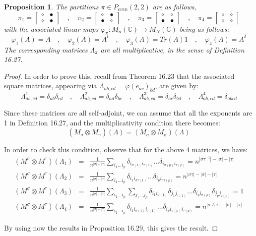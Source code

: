 \documentclass[12pt]{amsbook}
\newtheorem{proposition}[theorem]{Proposition}
\begin{document}
\begin{proposition}
The partitions $\pi\in P_{even}(2,2)$ are as follows,
$$\pi_1=\begin{bmatrix}\circ&\bullet\\ \circ&\bullet\end{bmatrix}\quad,\quad
\pi_2=\begin{bmatrix}\circ&\bullet\\ \bullet&\circ\end{bmatrix}\quad,\quad
\pi_3=\begin{bmatrix}\circ&\circ\\ \bullet&\bullet\end{bmatrix}\quad,\quad
\pi_4=\begin{bmatrix}\circ&\circ\\ \circ&\circ\end{bmatrix}$$
with the associated linear maps $\varphi_\pi:M_n(\mathbb C)\to M_N(\mathbb C)$ being as follows:
$$\varphi_1(A)=A\quad,\quad
\varphi_2(A)=A^t\quad,\quad
\varphi_3(A)=Tr(A)1\quad,\quad
\varphi_4(A)=A^\delta$$
The corresponding matrices $\Lambda_\pi$ are all multiplicative, in the sense of Definition 16.27.
\end{proposition}

\begin{proof}
In order to prove this, recall from Theorem 16.23 that the associated square matrices, appearing via $\Lambda_{ab,cd}=\varphi(e_{ac})_{bd}$, are given by:
$$\Lambda^1_{ab,cd}=\delta_{ab}\delta_{cd}\quad,\quad 
\Lambda^2_{ab,cd}=\delta_{ad}\delta_{bc}\quad,\quad
\Lambda^3_{ab,cd}=\delta_{ac}\delta_{bd}\quad,\quad
\Lambda^4_{ab,cd}=\delta_{abcd}$$

Since these matrices are all self-adjoint, we can assume that all the exponents are 1 in Definition 16.27, and the multiplicativity condition there becomes:
$$(M_\sigma\otimes M_\gamma)(\Lambda)=(M_\sigma\otimes M_\sigma)(\Lambda)$$

In order to check this condition, observe that for the above 4 matrices, we have:
\begin{eqnarray*}
(M^\sigma\otimes M^\tau)(\Lambda_1)&=&\frac{1}{n^{|\sigma|+|\tau|}}\sum_{i_1\ldots i_p}\delta_{i_{\sigma(1)}i_{\tau(1)}}\ldots\delta_{i_{\sigma(p)}i_{\tau(p)}}=n^{|\sigma\tau^{-1}|-|\sigma|-|\tau|}\\
(M^\sigma\otimes M^\tau)(\Lambda_2)&=&\frac{1}{n^{|\sigma|+|\tau|}}\sum_{i_1\ldots i_p}\delta_{i_1i_{\sigma\tau(1)}}\ldots\delta_{i_pi_{\sigma\tau(p)}}=n^{|\sigma\tau|-|\sigma|-|\tau|}\\
(M^\sigma\otimes M^\tau)(\Lambda_3)&=&\frac{1}{n^{|\sigma|+|\tau|}}\sum_{i_1\ldots i_p}\sum_{j_1\ldots j_p}\delta_{i_1i_{\sigma(1)}}\delta_{j_1j_{\tau(1)}}\ldots\delta_{i_pi_{\sigma(p)}}\delta_{j_pj_{\tau(p)}}=1\\
(M^\sigma\otimes M^\tau)(\Lambda_4)&=&\frac{1}{n^{|\sigma|+|\tau|}}\sum_{i_1\ldots i_p}\delta_{i_1i_{\sigma(1)}i_{\tau(1)}}\ldots\delta_{i_pi_{\sigma(p)}i_{\tau(p)}}=n^{|\sigma\wedge\tau|-|\sigma|-|\tau|}
\end{eqnarray*}

By using now the results in Proposition 16.29, this gives the result.
\end{proof}
\end{document}

